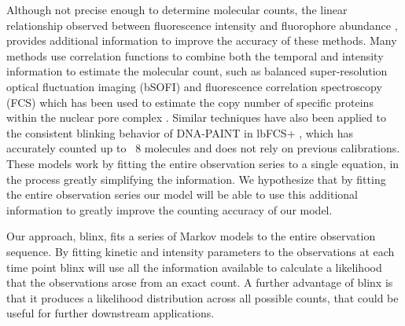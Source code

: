 Although not precise enough to determine molecular counts, the linear
relationship observed between fluorescence intensity and fluorophore abundance
\cite{schmied_fluorescence_2012}, provides additional information to improve the
accuracy of these methods.
%
  Many methods use correlation functions to combine both the temporal and
  intensity information to estimate the molecular count, such as balanced
  super-resolution optical fluctuation imaging (bSOFI) and fluorescence
  correlation spectroscopy (FCS) which has been used to estimate the copy
  number of specific proteins within the nuclear pore complex
  \cite{otsuka_quantitative_2023}. Similar techniques have also been applied to the
  consistent blinking behavior of DNA-PAINT in lbFCS+ \cite{stein_calibration-free_2021}, which has
  accurately counted up to ~8 molecules and does not rely on previous
  calibrations. These models work by fitting the entire observation series to a
  single equation, in the process greatly simplifying the information. We
  hypothesize that by fitting the entire observation series our model will be
  able to use this additional information to greatly improve the counting
  accuracy of our model.

Our approach, blinx, fits a series of Markov models to the entire
observation sequence.
%
  By fitting kinetic and intensity parameters to the observations at each time
  point blinx will use all the information available to calculate a
  likelihood that the observations arose from an exact count. A further
  advantage of blinx is that it produces a likelihood distribution across
  all possible counts, that could be useful for further downstream
  applications.
